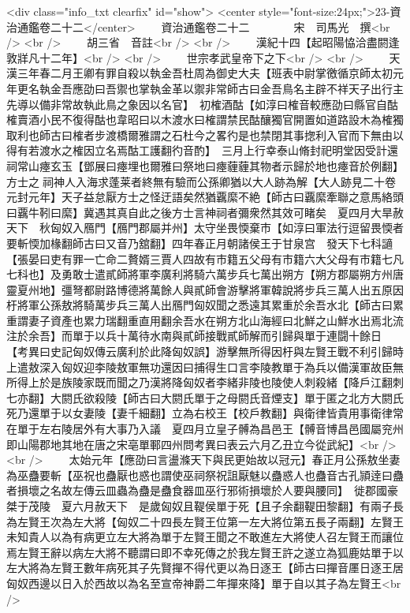 <div class="info_txt clearfix" id="show">
<center style="font-size:24px;">23-資治通鑑卷二十二</center>
  　　資治通鑑卷二十二　　　　宋　司馬光　撰<br />
<br />
　　胡三省　音註<br />
<br />
　　漢紀十四【起昭陽恊洽盡閼逢敦牂凡十二年】<br />
<br />
　　世宗孝武皇帝下之下<br />
<br />
　　天漢三年春二月王卿有罪自殺以執金吾杜周為御史大夫【班表中尉掌徼循京師太初元年更名執金吾應劭曰吾禦也掌執金革以禦非常師古曰金吾鳥名主辟不祥天子出行主先導以備非常故執此鳥之象因以名官】　初榷酒酤【如淳曰榷音較應劭曰縣官自酤榷賣酒小民不復得酤也韋昭曰以木渡水曰榷謂禁民酤釀獨官開置如道路設木為榷獨取利也師古曰榷者步渡橋爾雅謂之石杜今之畧彴是也禁閉其事揔利入官而下無由以得有若渡水之榷因立名焉酤工護翻彴音酌】　三月上行幸泰山脩封祀明堂因受計還祠常山瘞玄玉【鄧展曰瘞埋也爾雅曰祭地曰瘞薶薶其物者示歸於地也瘞音於例翻】方士之祠神人入海求蓬莱者終無有驗而公孫卿猶以大人跡為解【大人跡見二十卷元封元年】天子益怠厭方士之怪迂語矣然猶覊縻不絶【師古曰覊縻牽聯之意馬絡頭曰覊牛靷曰縻】冀遇其真自此之後方士言神祠者彌衆然其效可睹矣　夏四月大旱赦天下　秋匈奴入鴈門【鴈門郡屬并州】太守坐畏愞棄市【如淳曰軍法行逗留畏愞者要斬愞加椽翻師古曰又音乃舘翻】四年春正月朝諸侯王于甘泉宫　發天下七科讁【張晏曰吏有罪一亡命二贅婿三賈人四故有市籍五父母有市籍六大父母有市籍七凡七科也】及勇敢士遣貳師將軍李廣利將騎六萬步兵七萬出朔方【朔方郡屬朔方州唐靈夏州地】彊弩都尉路博德將萬餘人與貳師會游擊將軍韓說將步兵三萬人出五原因杅將軍公孫敖將騎萬步兵三萬人出鴈門匈奴聞之悉遠其累重於余吾水北【師古曰累重謂妻子資產也累力瑞翻重直用翻余吾水在朔方北山海經曰北鮮之山鮮水出焉北流注於余吾】而單于以兵十萬待水南與貳師接戰貳師解而引歸與單于連闘十餘日　【考異曰史記匈奴傳云廣利於此降匈奴誤】游擊無所得因杅與左賢王戰不利引歸時上遣敖深入匈奴迎李陵敖軍無功還因曰捕得生口言李陵教單于為兵以備漢軍故臣無所得上於是族陵家既而聞之乃漢將降匈奴者李緒非陵也陵使人刺殺緒【降戶江翻刺七亦翻】大閼氏欲殺陵【師古曰大閼氏單于之母閼氏音煙支】單于匿之北方大閼氏死乃還單于以女妻陵【妻千細翻】立為右校王【校戶教翻】與衛律皆貴用事衛律常在單于左右陵居外有大事乃入議　夏四月立皇子髆為昌邑王【髆音博昌邑國屬兖州即山陽郡地其地在唐之宋亳單鄆四州問考異曰表云六月乙丑立今從武紀】<br />
<br />
　　太始元年【應劭曰言盪滌天下與民更始故以冠元】春正月公孫敖坐妻為巫蠱要斬【巫祝也蠱厭也惑也謂使巫祠祭祝詛厭魅以蠱惑人也蠱音古孔頴逹曰蠱者損壞之名故左傳云皿蟲為蠱是蠱食器皿巫行邪術損壞於人要與腰同】　徙郡國豪桀于茂陵　夏六月赦天下　是歲匈奴且鞮侯單于死【且子余翻鞮田黎翻】有兩子長為左賢王次為左大將【匈奴二十四長左賢王位第一左大將位第五長子兩翻】左賢王未知貴人以為有病更立左大將為單于左賢王聞之不敢進左大將使人召左賢王而讓位焉左賢王辭以病左大將不聽謂曰即不幸死傳之於我左賢王許之遂立為狐鹿姑單于以左大將為左賢王數年病死其子先賢撣不得代更以為日逐王【師古曰撣音㕓日逐王居匈奴西邊以日入於西故以為名至宣帝神爵二年撣來降】單于自以其子為左賢王<br />
